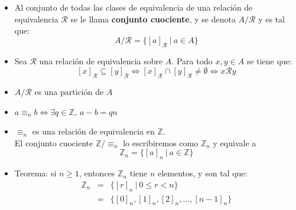\documentclass[letterpaper,10pt]{article}
\newcommand{\Z}{\mathbb Z}
\newcommand{\ssi}{\Longleftrightarrow} %
\theoremstyle{plain}
\begin{document}
\begin{framed}
\begin{multicols}{2}
\begin{itemize}
                    \item Al conjunto de todas las clases de equivalencia de una relación de equivalencia $\mathcal{R}$ se le llama \textbf{conjunto cuociente}, y se denota $A/\mathcal{R}$ y es tal que:
                    $$A/\mathcal{R}=\{[a]_{\mathcal{R}} ~|~ a \in A\}$$
    
                    \item Sea $\mathcal{R}$ una relación de equivalencia sobre $A$. Para todo $x,y \in A$ se tiene que:
                    $$[x]_{\mathcal{R}} \subseteq [y]_{\mathcal{R}} \ssi [x]_{\mathcal{R}} \cap [y]_{\mathcal{R}} \neq \emptyset \ssi x\mathcal{R}y$$
    
                    \item $A/\mathcal{R}$ es una partición de $A$
    
                    \item $a \equiv_{n} b \ssi \exists q \in \Z, ~ a-b=qn$
    
                    \item $\equiv_{n}$ es una relación de equivalencia en $\Z$.\\
                    El conjunto cuociente $\Z / \equiv_{n}$ lo escribiremos como $\Z_{n}$ y equivale a $$\Z_{n}=\{[a]_{n} ~|~ a \in \Z \}$$
    
                    \item Teorema: si $n \geq 1$, entonces $\Z_{n}$ tiene $n$ elementos, y son tal que:
                    \begin{align*}
                        \Z_{n} & = & \{[r]_{n} ~|~ 0 \leq r < n \} \\
                        & = & \{[0]_{n},[1]_{n},[2]_{n}, \dots , [n-1]_{n} \}
                    \end{align*}
            \end{itemize}
        \end{multicols}
\end{framed}
\end{document}
